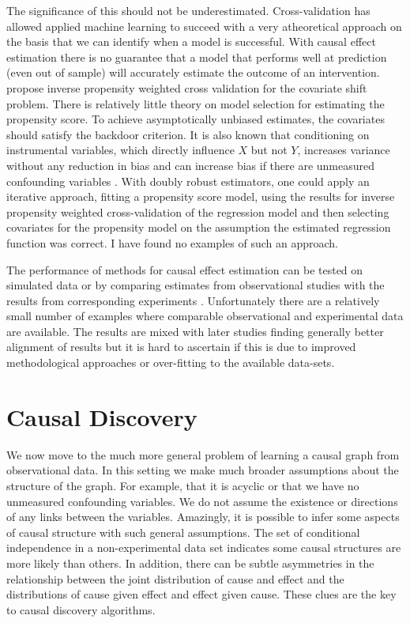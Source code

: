 \documentclass[11pt,a4paper,oneside]{book}
\theoremstyle{plain}
\theoremstyle{definition}
\begin{document}
The significance of this should not be underestimated. Cross-validation has allowed applied machine learning to succeed with a very atheoretical approach on the basis that we can identify when a model is successful. With causal effect estimation there is no guarantee that a model that performs well at prediction (even out of sample) will accurately estimate the outcome of an intervention. \citet{Sugiyama2007} propose inverse propensity weighted cross validation for the covariate shift problem. There is relatively little theory on model selection for estimating the propensity score. To achieve asymptotically unbiased estimates, the covariates should satisfy the backdoor criterion. It is also known that conditioning on instrumental variables, which directly influence $X$ but not $Y$, increases variance without any reduction in bias and can increase bias if there are unmeasured confounding variables \citep{Wooldridge2009,Bhattacharya2012,Pearl2012b,Myers2011}. With doubly robust estimators, one could apply an iterative approach, fitting a propensity score model, using the results for inverse propensity weighted cross-validation of the regression model and then selecting covariates for the propensity model on the assumption the estimated regression function was correct. I have found no examples of such an approach.

The performance of methods for causal effect estimation can be tested on simulated data \citep{Frolich2001,zhao2004using,Hill2011,Dorie2016} or by comparing estimates from observational studies with the results from corresponding experiments \citep{lalonde1986evaluating,Fraker1987,heckman1997matching,heckman1998characterizing,dehejia1999causal,Smith2001,Anglemyer2014}. Unfortunately there are a relatively small number of examples where comparable observational and experimental data are available. The results are mixed with later studies finding generally better alignment of results but it is hard to ascertain if this is due to improved methodological approaches or over-fitting to the available data-sets.  


\section{Causal Discovery}
\label{sec:causal-discovery}


We now move to the much more general problem of learning a causal graph from observational data. In this setting we make much broader assumptions about the structure of the graph. For example, that it is acyclic or that we have no unmeasured confounding variables. We do not assume the existence or directions of any links between the variables. Amazingly, it is possible to infer some aspects of causal structure with such general assumptions. The set of conditional independence in a non-experimental data set indicates some causal structures are more likely than others. In addition, there can be subtle asymmetries in the relationship between the joint distribution of cause and effect and the distributions of cause given effect and effect given cause. These clues are the key to causal discovery algorithms.
\end{document}

